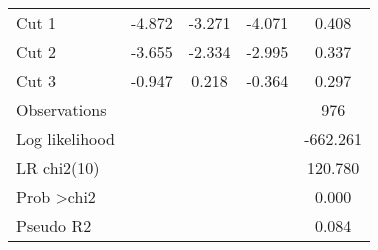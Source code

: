 \begin{table}[H]
\begin{tabular}{lcccc}
Cut 1                        & -4.872      & -3.271    & -4.071     & 0.408     \\
Cut 2                        & -3.655      & -2.334    & -2.995     & 0.337     \\
Cut 3                        & -0.947      & 0.218     & -0.364     & 0.297     \\
\midrule
Observations                 &             &           &            & 976       \\
Log likelihood               &             &           &            & -662.261  \\
LR chi2(10)                  &             &           &            & 120.780   \\
Prob \textgreater chi2       &             &           &            & 0.000     \\
Pseudo R2                    &             &           &            & 0.084     \\
\bottomrule
\end{tabular}
\end{table}


